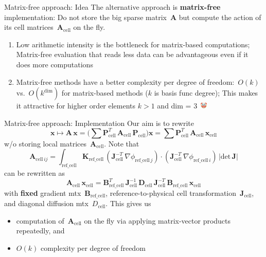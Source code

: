 \documentclass[svgnames]{beamer} %
\newcommand{\vect}[1]{\boldsymbol{\mathbf{#1}}}
\begin{document}
	\begin{frame}{Matrix-free approach: Idea}
	The alternative approach is \textbf{matrix-free} implementation: Do not store the big sparse matrix~$\vect A$ but compute the action of its cell matrices~$\vect A_\text{cell}$ on the fly.
		\begin{enumerate}
			\item Low arithmetic intensity is the bottleneck for matrix-based computations; Matrix-free evaluation that reads less data can be advantageous even if it does more computations
			\item Matrix-free methods have a better complexity per degree of freedom:~$O(k)$ vs.~$O(k^\text{dim})$ for matrix-based methods ($k$ is basis func degree); This makes it attractive for higher order elements $k > 1$ and dim = 3~\includegraphics[width=12px]{clown.png}
		\end{enumerate}
	\end{frame}	
	
	\begin{frame}{Matrix-free approach: Implementation}
		Our aim is to rewrite
		$$
			\vect x \mapsto \vect A\,\vect x = \big(\sum \vect P^T_\text{cell}\,\vect A_\text{cell}\,\vect P_\text{cell}\big)\vect x = \sum \vect P^T_\text{cell}\,\vect A_\text{cell}\,\vect x_\text{cell}
		$$
		w/o storing local matrices~$\vect A_\text{cell}$. Note that
		$$
			\vect A_{\text{cell}\,ij} = \int_\text{ref\_cell} \vect K_\text{ref\_cell}\,(\vect J^{-T}_\text{cell}\,\nabla\phi_{\text{ref\_cell}\,j})\cdot(\vect J^{-T}_\text{cell}\,\nabla\phi_{\text{ref\_cell}\,i})\,|\text{det}\,
			\vect J|
		$$
		can be rewritten as
		$$
			\vect A_\text{cell}\,\vect x_\text{cell} = \vect B^{T}_\text{ref\_cell}\,\vect J^{-1}_\text{cell}\,\vect D_\text{cell}\,\vect J^{-T}_\text{cell}\,\vect B_\text{ref\_cell}\,\vect x_\text{cell}
		$$
		with \textbf{fixed} gradient mtx~$\vect B_\text{ref\_cell}$, reference-to-physical cell transformation~$\vect J_\text{cell}$, and diagonal diffusion mtx~$D_\text{cell}$. This gives us
		\begin{itemize}
			\item computation of~$\vect A_\text{cell}$ on the fly via applying matrix-vector products repeatedly, and
			\item $O(k)$ complexity per degree of freedom
		\end{itemize}
	\end{frame}	
\end{document}
